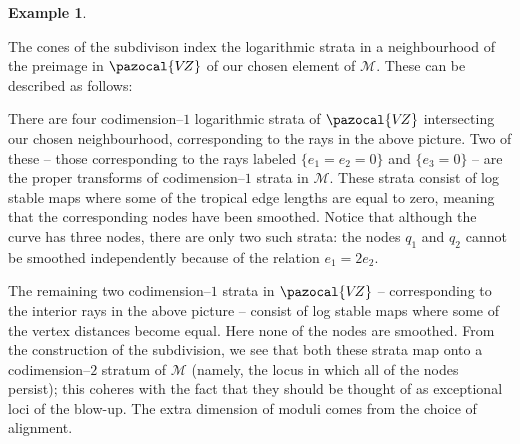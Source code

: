 \documentclass[11pt]{amsart}
\newcommand{\sqC}{\scalebox{0.8}[1.3]{$\sqsubset$}}
\newcommand{\VZ}{\pazocal{V\!Z}}
\newcommand{\Mcal}{\mathcal{M}}
\theoremstyle{definition}
\theoremstyle{definition}
\newtheorem{example}[thm]{Example}
\begin{document}
\begin{example}
\begin{center}
\end{center}
The cones of the subdivison index the logarithmic strata in a neighbourhood of the preimage in $\VZ$ of our chosen element of $\Mcal$. These can be described as follows:
\begin{center}
\end{center}
There are four codimension--$1$ logarithmic strata of $\VZ$ intersecting our chosen neighbourhood, corresponding to the rays in the above picture. Two of these -- those corresponding to the rays labeled $\{ e_1=e_2=0 \}$ and $\{ e_3=0 \}$ -- are the proper transforms of codimension--$1$ strata in $\Mcal$. These strata consist of log stable maps where some of the tropical edge lengths are equal to zero, meaning that the corresponding nodes have been smoothed. Notice that although the curve has three nodes, there are only two such strata: the nodes $q_1$ and $q_2$ cannot be smoothed independently because of the relation $e_1=2e_2$.

The remaining two codimension--$1$ strata in $\VZ$ -- corresponding to the interior rays in the above picture -- consist of log stable maps where some of the vertex distances become equal. Here none of the nodes are smoothed. From the construction of the subdivision, we see that both these strata map onto a codimension--$2$ stratum of $\Mcal$ (namely, the locus in which all of the nodes persist); this coheres with the fact that they should be thought of as exceptional loci of the blow-up. The extra dimension of moduli comes from the choice of alignment.


\end{example}
\end{document}
